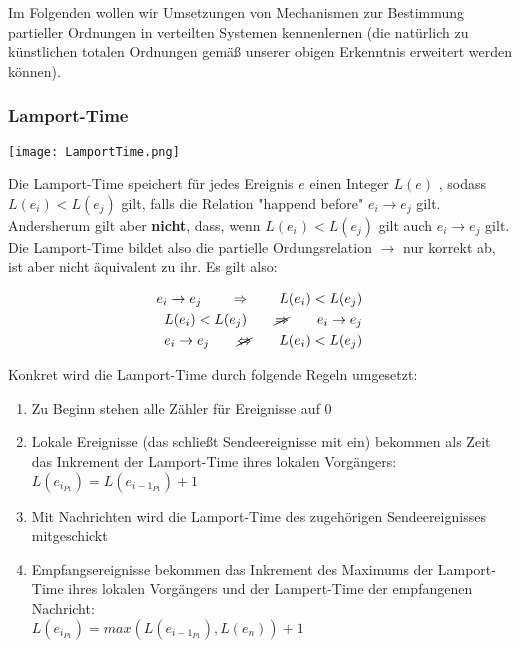 Im Folgenden wollen wir Umsetzungen von Mechanismen zur Bestimmung partieller Ordnungen in verteilten Systemen kennenlernen (die natürlich zu künstlichen totalen Ordnungen gemäß unserer obigen Erkenntnis erweitert werden können).

\subsubsection{Lamport-Time}
\label{sec:lamport-time}

\texttt{[image: LamportTime.png]}

Die Lamport-Time speichert für jedes Ereignis $e$ einen Integer $L(e)$ , sodass $L(e_{i}) < L(e_{j})$ gilt, falls die Relation "happend before" $e_{i} \rightarrow e_{j}$ gilt. Andersherum gilt aber \textbf{nicht}, dass, wenn $L(e_{i}) < L(e_{j})$ gilt auch $e_{i} \rightarrow e_{j}$ gilt. Die Lamport-Time bildet also die partielle Ordungsrelation  $\rightarrow$ nur korrekt ab, ist aber nicht äquivalent zu ihr. Es gilt also:

\begin{align*}
    e_{i} \rightarrow e_{j} \qquad \Rightarrow \qquad  L(e_{i}) < L(e_{j})         \\
    L(e_{i}) < L(e_{j}) \qquad \cancel{\Rightarrow} \qquad e_{i} \rightarrow e_{j} \\
    e_{i} \rightarrow e_{j} \qquad \cancel{\Leftrightarrow} \qquad L(e_{i}) < L(e_{j})
\end{align*}

Konkret wird die Lamport-Time durch folgende Regeln umgesetzt:
\begin{enumerate}
    \item Zu Beginn stehen alle Zähler für Ereignisse auf 0
    \item Lokale Ereignisse (das schließt Sendeereignisse mit ein) bekommen als Zeit das Inkrement der  Lamport-Time ihres lokalen Vorgängers:\\
          $L(e_{i_{P1}}) = L(e_{i - 1_{P1}}) + 1$
    \item Mit Nachrichten wird die Lamport-Time des zugehörigen Sendeereignisses mitgeschickt
    \item Empfangsereignisse bekommen das Inkrement des Maximums der Lamport-Time ihres lokalen Vorgängers und der Lampert-Time der empfangenen Nachricht:\\
          $L(e_{i_{P1}}) = max(L(e_{i - 1_{P1}}), L(e_{n})) + 1$
\end{enumerate}

